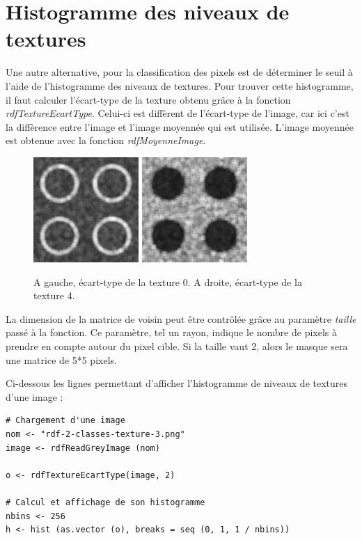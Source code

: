 \documentclass[11pt]{article}
\begin{document}
  \section{Histogramme des niveaux de textures}
  
  Une autre alternative, pour la classification des pixels est de déterminer le seuil à l'aide de 
  l'histogramme des niveaux de textures. Pour trouver cette histogramme, il faut calculer l'écart-type de la texture
  obtenu grâce à la fonction \textit{rdfTextureEcartType}. Celui-ci est diffèrent de l'écart-type de l'image, car ici 
  c'est la diffèrence entre l'image et l'image moyennée qui est utilisée. L'image moyennée est obtenue avec 
  la fonction \textit{rdfMoyenneImage}.\\
  
  \begin{figure}[H]
    \center
    \includegraphics[width=4cm]{texture-0/texture-0-5-ecart-type.png}
    \includegraphics[width=4cm]{texture-4/texture-4-5-ecart-type.png}
    \caption{A gauche, écart-type de la texture 0. A droite, écart-type de la texture 4.}
  \end{figure}
  
  La dimension de la matrice de voisin peut être contrôlée 
  grâce au paramètre \textit{taille} passé à la fonction. Ce paramètre, tel un rayon, indique le nombre de 
  pixels à prendre en compte autour du pixel cible. Si la taille vaut 2, alors le masque sera une matrice de 5*5 
  pixels.\\
  
  \newpage
  
  Ci-dessous les lignes permettant d'afficher l'histogramme de niveaux de textures d'une image :
  \begin{lstlisting}[caption=Afficher l'histogramme de niveaux de textures d'une image]
# Chargement d'une image
nom <- "rdf-2-classes-texture-3.png"
image <- rdfReadGreyImage (nom)

o <- rdfTextureEcartType(image, 2)

# Calcul et affichage de son histogramme
nbins <- 256
h <- hist (as.vector (o), breaks = seq (0, 1, 1 / nbins))\end{lstlisting}
  
\end{document}
